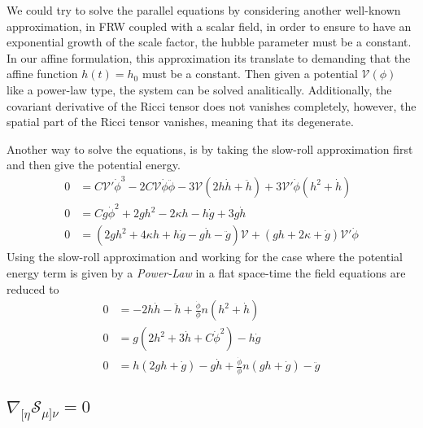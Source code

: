 \documentclass[10pt,a4paper]{article}
\begin{document}
We could try to solve the parallel equations by considering another well-known approximation, in FRW coupled with a scalar field, in order to ensure
to have an exponential growth of the scale factor, the hubble parameter must be a constant. In our affine formulation, this approximation its translate to demanding
that the affine function $h(t) = h_0$ must be a constant. Then given a potential $\mathcal{V}(\phi)$ like a power-law type, the system can be solved analitically. Additionally, the covariant 
derivative of the Ricci tensor does not vanishes completely, however, the spatial part of the Ricci tensor vanishes, meaning that its degenerate. 

Another way to solve the equations, is by taking the slow-roll approximation first and then give the potential energy.
\begin{align}
  0 & = C\mathcal{V}'\dot{\phi}^3-2C\mathcal{V}\dot{\phi}\ddot{\phi} - 3\mathcal{V}\left(2h\dot{h} + \ddot{h}\right) + 3\mathcal{V}'\dot{\phi}
  \left(h^{2} + \dot{h}\right) \\
  0 & = Cg\dot{\phi}^2 + 2gh^2 - 2\kappa h - h\dot{g} + 3g\dot{h} \\
  0 & = \left(2gh^2 + 4\kappa h +h\dot{g} - g \dot{h} - \ddot{g}\right)\mathcal{V} + \left(gh + 2\kappa + \dot{g}\right)\mathcal{V}'\dot{\phi}
\end{align}
Using the slow-roll approximation and working for the case where the potential energy term is given by a \textit{Power-Law} in a flat space-time the field equations are 
reduced to
\begin{align}
  0 & = -2h\dot{h} - \ddot{h} + \frac{\dot{\phi}}{\phi}n\left(h^2 + \dot{h}\right) \\
  0 & = g\left(2h^2 + 3\dot{h} + C\dot{\phi}^2\right) - h\dot{g}\\
  0 & = h\left(2gh + \dot{g}\right) - g\dot{h} + \frac{\dot{\phi}}{\phi}n\left(gh + \dot{g}\right) - \ddot{g}
\end{align}


\subsection{$\nabla_{[\eta} \mathcal{S}_{\mu]\nu} = 0 $}
\end{document}
